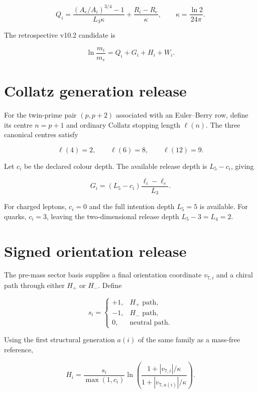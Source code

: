 \begin{equation}
Q_i=
\frac{(A_e/A_i)^{3/4}-1}{L_3\kappa}
+
\frac{R_i-R_e}{\kappa},
\qquad
\kappa=\frac{\ln2}{24\pi}.
\label{eq:quarter_base_Q}
\end{equation}

The retrospective v10.2 candidate is

\begin{equation}
\ln\frac{m_i}{m_e}=Q_i+G_i+H_i+W_i.
\label{eq:sector_full_operator}
\end{equation}

\section{Collatz generation release}

For the twin-prime pair $(p,p+2)$ associated with an Euler--Berry row, define
its centre $n=p+1$ and ordinary Collatz stopping length $\ell(n)$.  The three
canonical centres satisfy

\[
\ell(4)=2,
\qquad
\ell(6)=8,
\qquad
\ell(12)=9.
\]

Let $c_i$ be the declared colour depth.  The available release depth is
$L_5-c_i$, giving

\begin{equation}
G_i=(L_5-c_i)\frac{\ell_i-\ell_e}{L_3}.
\label{eq:collatz_generation_release}
\end{equation}

For charged leptons, $c_i=0$ and the full intention depth $L_5=5$ is
available.  For quarks, $c_i=3$, leaving the two-dimensional release depth
$L_5-3=L_4=2$.

\section{Signed orientation release}

The pre-mass sector basis supplies a final orientation coordinate $v_{7,i}$
and a chiral path through either $H_+$ or $H_-$.  Define

\[
s_i=
\begin{cases}
+1,& H_+\text{ path},\\
-1,& H_-\text{ path},\\
0,& \text{neutral path}.
\end{cases}
\]

Using the first structural generation $a(i)$ of the same family as a
mass-free reference,

\begin{equation}
H_i=
\frac{s_i}{\max(1,c_i)}
\ln\left(
\frac{1+|v_{7,i}|/\kappa}
     {1+|v_{7,a(i)}|/\kappa}
\right).
\label{eq:signed_orientation_release}
\end{equation}

